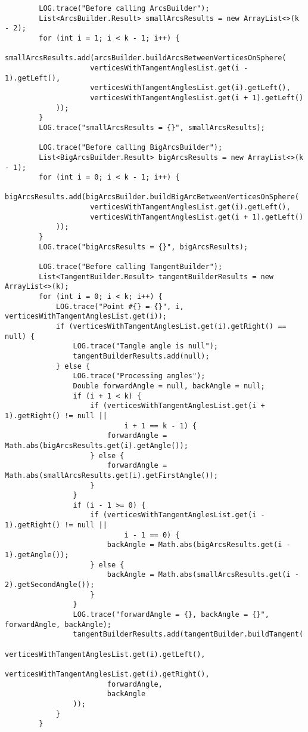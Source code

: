 \begin{verbatim}
        LOG.trace("Before calling ArcsBuilder");
        List<ArcsBuilder.Result> smallArcsResults = new ArrayList<>(k - 2);
        for (int i = 1; i < k - 1; i++) {
            smallArcsResults.add(arcsBuilder.buildArcsBetweenVerticesOnSphere(
                    verticesWithTangentAnglesList.get(i - 1).getLeft(),
                    verticesWithTangentAnglesList.get(i).getLeft(),
                    verticesWithTangentAnglesList.get(i + 1).getLeft()
            ));
        }
        LOG.trace("smallArcsResults = {}", smallArcsResults);

        LOG.trace("Before calling BigArcsBuilder");
        List<BigArcsBuilder.Result> bigArcsResults = new ArrayList<>(k - 1);
        for (int i = 0; i < k - 1; i++) {
            bigArcsResults.add(bigArcsBuilder.buildBigArcBetweenVerticesOnSphere(
                    verticesWithTangentAnglesList.get(i).getLeft(),
                    verticesWithTangentAnglesList.get(i + 1).getLeft()
            ));
        }
        LOG.trace("bigArcsResults = {}", bigArcsResults);

        LOG.trace("Before calling TangentBuilder");
        List<TangentBuilder.Result> tangentBuilderResults = new ArrayList<>(k);
        for (int i = 0; i < k; i++) {
            LOG.trace("Point #{} = {}", i, verticesWithTangentAnglesList.get(i));
            if (verticesWithTangentAnglesList.get(i).getRight() == null) {
                LOG.trace("Tangle angle is null");
                tangentBuilderResults.add(null);
            } else {
                LOG.trace("Processing angles");
                Double forwardAngle = null, backAngle = null;
                if (i + 1 < k) {
                    if (verticesWithTangentAnglesList.get(i + 1).getRight() != null ||
                            i + 1 == k - 1) {
                        forwardAngle = Math.abs(bigArcsResults.get(i).getAngle());
                    } else {
                        forwardAngle = Math.abs(smallArcsResults.get(i).getFirstAngle());
                    }
                }
                if (i - 1 >= 0) {
                    if (verticesWithTangentAnglesList.get(i - 1).getRight() != null ||
                            i - 1 == 0) {
                        backAngle = Math.abs(bigArcsResults.get(i - 1).getAngle());
                    } else {
                        backAngle = Math.abs(smallArcsResults.get(i - 2).getSecondAngle());
                    }
                }
                LOG.trace("forwardAngle = {}, backAngle = {}", forwardAngle, backAngle);
                tangentBuilderResults.add(tangentBuilder.buildTangent(
                        verticesWithTangentAnglesList.get(i).getLeft(),
                        verticesWithTangentAnglesList.get(i).getRight(),
                        forwardAngle,
                        backAngle
                ));
            }
        }


\end{verbatim}
